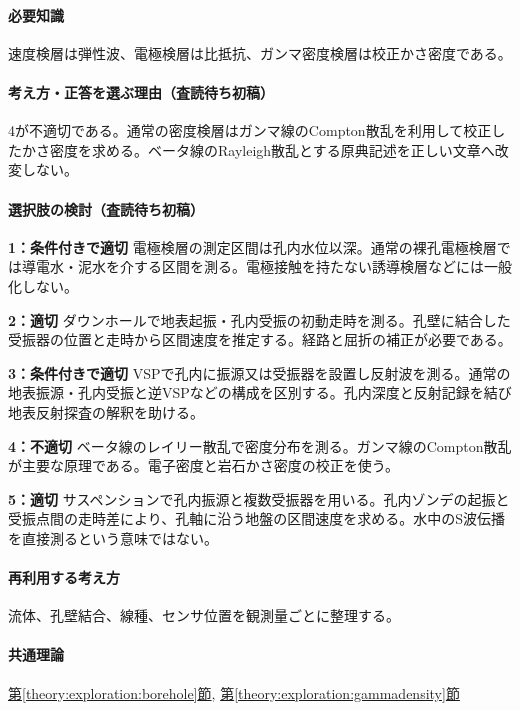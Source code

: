 \paragraph{必要知識} 速度検層は弾性波、電極検層は比抵抗、ガンマ密度検層は校正かさ密度である。

\paragraph{考え方・正答を選ぶ理由（査読待ち初稿）} 4が不適切である。通常の密度検層はガンマ線のCompton散乱を利用して校正したかさ密度を求める。ベータ線のRayleigh散乱とする原典記述を正しい文章へ改変しない。

\paragraph{選択肢の検討（査読待ち初稿）}\mbox{}\par

\noindent\textbf{1：条件付きで適切} 電極検層の測定区間は孔内水位以深。通常の裸孔電極検層では導電水・泥水を介する区間を測る。電極接触を持たない誘導検層などには一般化しない。\par

\noindent\textbf{2：適切} ダウンホールで地表起振・孔内受振の初動走時を測る。孔壁に結合した受振器の位置と走時から区間速度を推定する。経路と屈折の補正が必要である。\par

\noindent\textbf{3：条件付きで適切} VSPで孔内に振源又は受振器を設置し反射波を測る。通常の地表振源・孔内受振と逆VSPなどの構成を区別する。孔内深度と反射記録を結び地表反射探査の解釈を助ける。\par

\noindent\textbf{4：不適切} ベータ線のレイリー散乱で密度分布を測る。ガンマ線のCompton散乱が主要な原理である。電子密度と岩石かさ密度の校正を使う。\par

\noindent\textbf{5：適切} サスペンションで孔内振源と複数受振器を用いる。孔内ゾンデの起振と受振点間の走時差により、孔軸に沿う地盤の区間速度を求める。水中のS波伝播を直接測るという意味ではない。\par

\paragraph{再利用する考え方} 流体、孔壁結合、線種、センサ位置を観測量ごとに整理する。

\paragraph{共通理論} \hyperref[theory:exploration:borehole]{第\ref*{theory:exploration:borehole}節}, \hyperref[theory:exploration:gammadensity]{第\ref*{theory:exploration:gammadensity}節}

